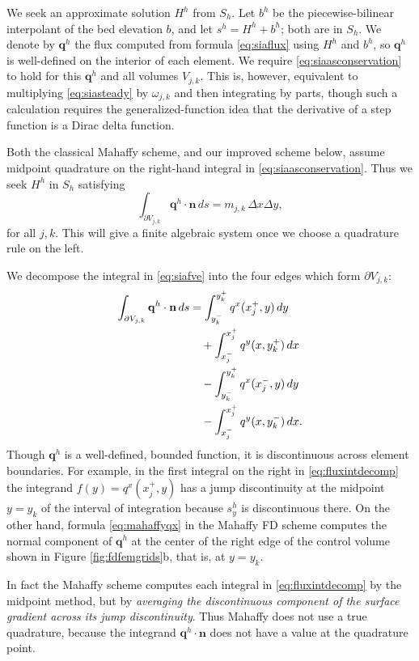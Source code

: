 \documentclass[twocolumn,letterpaper]{igs}
\newcommand\bn{\mathbf{n}}
\newcommand\bq{\mathbf{q}}
\begin{document}
We seek an approximate solution $H^h$ from $S_h$.  Let $b^h$ be the piecewise-bilinear interpolant of the bed elevation $b$, and let $s^h=H^h+b^h$; both are in $S_h$.  We denote by $\bq^h$ the flux computed from formula \eqref{eq:siaflux} using $H^h$ and $b^h$, so $\bq^h$ is well-defined on the interior of each element.  We require \eqref{eq:siaasconservation} to hold for this $\bq^h$ and all volumes $V_{j,k}$.  This is, however, equivalent to multiplying \eqref{eq:siasteady} by $\omega_{j,k}$ and then integrating by parts, though such a calculation requires the generalized-function idea that the derivative of a step function is a Dirac delta function.

Both the classical Mahaffy scheme, and our improved scheme below, assume midpoint quadrature on the right-hand integral in \eqref{eq:siaasconservation}.  Thus we seek $H^h$ in $S_h$ satisfying
\begin{equation}
  \int_{\partial V_{j,k}} \bq^h \cdot \bn\,ds = m_{j,k}\, \Delta x \Delta y, \label{eq:siafve}
\end{equation}
for all $j,k$.  This will give a finite algebraic system once we choose a quadrature rule on the left.

We decompose the integral in \eqref{eq:siafve} into the four edges which form $\partial V_{j,k}$:
\begin{align}
\int_{\partial V_{j,k}} \bq^h \cdot \bn\,ds &= \int_{y_k^-}^{y_k^+} q^x(x_j^+,y)\,dy \label{eq:fluxintdecomp} \\
&\quad + \int_{x_j^-}^{x_j^+} q^y(x,y_k^+)\,dx \notag \\
&\quad - \int_{y_k^-}^{y_k^+} q^x(x_j^-,y)\,dy \notag \\
&\quad - \int_{x_j^-}^{x_j^+} q^y(x,y_k^-)\,dx. \notag
\end{align}
Though $\bq^h$ is a well-defined, bounded function, it is discontinuous across element boundaries.  For example, in the first integral on the right in \eqref{eq:fluxintdecomp} the integrand $f(y) = q^x(x_j^+,y)$ has a jump discontinuity at the midpoint $y=y_k$ of the interval of integration because $s^h_y$ is discontinuous there.  On the other hand, formula \eqref{eq:mahaffyqx} in the Mahaffy FD scheme computes the normal component of $\bq^h$ at the center of the right edge of the control volume shown in Figure \ref{fig:fdfemgrids}b, that is, at $y=y_k$.

In fact the Mahaffy scheme computes each integral in \eqref{eq:fluxintdecomp} by the midpoint method, but by \emph{averaging the discontinuous component of the surface gradient across its jump discontinuity}.  Thus Mahaffy does not use a true quadrature, because the integrand $\bq^h\cdot \bn$ does not have a value at the quadrature point.
\end{document}
